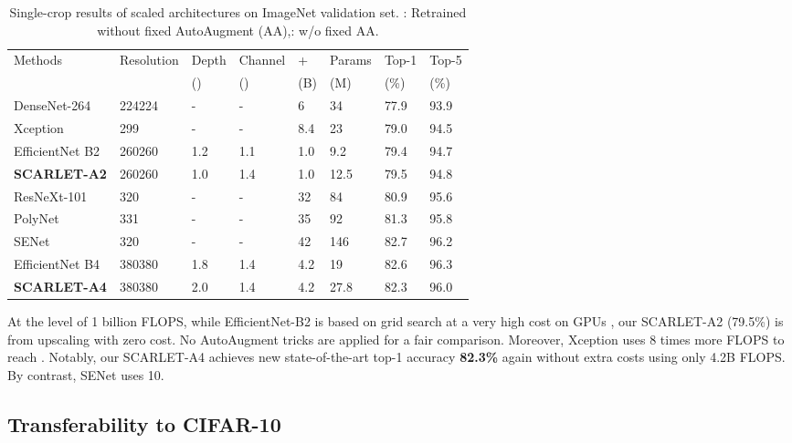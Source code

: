 \documentclass[10pt,twocolumn,letterpaper]{article}
\theoremstyle{definition}
\begin{document}
\setlength{\tabcolsep}{4pt}
\begin{table*}
	\begin{center}
	\begin{small}
			\begin{tabular}{*{8}{|l}|} 		
				\hline
				Methods & Resolution & Depth& Channel & +  & Params & Top-1  & Top-5  \\
				&  & () &  () & (B) & (M) & (\%) & (\%) \\
				\hline
				DenseNet-264 \cite{huang2017densely} &224224&-&-& 6 & 34&77.9&93.9 \\
				Xception \cite{chollet2017xception} &299&-&-& 8.4 & 23 & 79.0 & 94.5 \\
				EfficientNet B2 \cite{tan2019efficientnet}& 260260 & 1.2 & 1.1 & 1.0  & 9.2 & 79.4 & 94.7 \\ \textbf{SCARLET-A2}  &260260 &1.0 &1.4& 1.0  & 12.5 & 79.5  & 94.8
				\\ \hline
				ResNeXt-101 \cite{xie2017aggregated} & 320 &-&-&32&84 & 80.9 & 95.6 \\
				PolyNet \cite{zhang2017polynet}  &331 &-&-& 35&92&81.3&95.8 \\
				SENet \cite{hu2018squeeze}
				&320&-&-&42 & 146 & 82.7 & 96.2 \\
				EfficientNet B4 \cite{tan2019efficientnet} &380380 &1.8& 1.4 & 4.2  & 19 & 82.6 & 96.3 \\
				\textbf{SCARLET-A4}  & 380380 & 2.0& 1.4& 4.2  & 27.8 & 82.3  & 96.0 \\
				\hline
			\end{tabular}
	\end{small}
	\end{center}
	\caption{Single-crop results of scaled architectures on ImageNet validation set. : Retrained without fixed AutoAugment (AA),: w/o fixed AA.}
	\label{tab:scaling}
\end{table*}


At the level of 1 billion FLOPS, while EfficientNet-B2 is based on grid search at a very high cost on GPUs \cite{tan2019efficientnet}, our SCARLET-A2 (79.5\%) is from upscaling with zero cost. No AutoAugment tricks are applied for a fair comparison.  Moreover, Xception \cite{chollet2017xception} uses 8 times more FLOPS to reach .  Notably, our SCARLET-A4 achieves new state-of-the-art top-1 accuracy \textbf{82.3\%} again without extra costs using only 4.2B FLOPS. By contrast, SENet \cite{hu2018squeeze} uses 10.

\subsection{Transferability to CIFAR-10}
\end{document}
